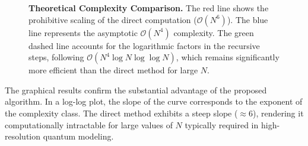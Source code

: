 \documentclass[11pt]{article}
\theoremstyle{definition}
\theoremstyle{remark}
\numberwithin{equation}{section}
\begin{document}
\begin{figure}[!ht]
    \centering
    \caption{\textbf{Theoretical Complexity Comparison.} The red line shows the prohibitive scaling of the direct computation ($\mathcal{O}(N^6)$). The blue line represents the asymptotic $\mathcal{O}(N^4)$ complexity. The green dashed line accounts for the logarithmic factors in the recursive steps, following $\mathcal{O}(N^4 \log N \log \log N)$, which remains significantly more efficient than the direct method for large $N$.}\label{fig:ftvsfft}
\end{figure}




The graphical results confirm the substantial advantage of the proposed algorithm. In a log-log plot, the slope of the curve corresponds to the exponent of the complexity class. The direct method exhibits a steep slope ($\approx 6$), rendering it computationally intractable for large values of $N$ typically required in high-resolution quantum modeling. \\%
\end{document}
